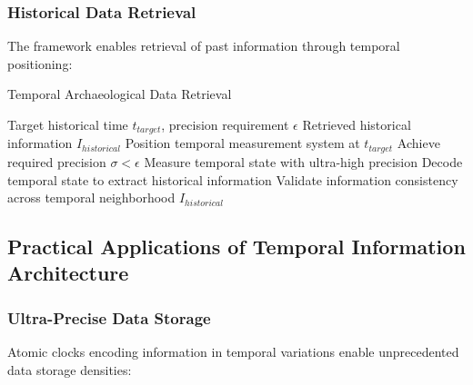 \documentclass[12pt,a4paper]{article}
\begin{document}
{\subsubsection{Historical Data Retrieval}

The framework enables retrieval of past information through temporal positioning:

\begin{algorithm}[H]
\caption{Temporal Archaeological Data Retrieval}
\begin{algorithmic}[1]
\REQUIRE Target historical time $t_{target}$, precision requirement $\epsilon$
\ENSURE Retrieved historical information $I_{historical}$
\STATE Position temporal measurement system at $t_{target}$
\STATE Achieve required precision $\sigma < \epsilon$
\STATE Measure temporal state with ultra-high precision
\STATE Decode temporal state to extract historical information
\STATE Validate information consistency across temporal neighborhood
\RETURN $I_{historical}$
\end{algorithmic}
\end{algorithm}

\subsection{Practical Applications of Temporal Information Architecture}

\subsubsection{Ultra-Precise Data Storage}

Atomic clocks encoding information in temporal variations enable unprecedented data storage densities:

\begin{figure}[H]
\centering
{}
\end{figure}}
\end{document}
